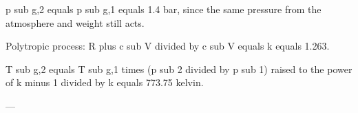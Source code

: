 p sub g,2 equals p sub g,1 equals 1.4 bar, since the same pressure from the atmosphere and weight still acts.  

Polytropic process:  
R plus c sub V divided by c sub V equals k equals 1.263.  

T sub g,2 equals T sub g,1 times (p sub 2 divided by p sub 1) raised to the power of k minus 1 divided by k equals 773.75 kelvin.  

---